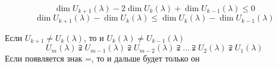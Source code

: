 \documentclass[algebra]{subfiles}
\begin{document}
    \begin{Consequence}
        \[\dim U_{k+1}(\lambda) - 2 \dim U_k(\lambda) + \dim U_{k-1}(\lambda) \leq 0\]
        \[\dim U_{k+1}(\lambda) - \dim U_k(\lambda) \leq \dim U_k(\lambda) - \dim U_{k-1}(\lambda)\]
    \end{Consequence}

    \begin{consequence}
        Если $U_{k+1} \neq U_k(\lambda)$, то и $U_k(\lambda) \neq U_{k-1}(\lambda)$
        \[U_m(\lambda) \supsetneqq U_{m-1} (\lambda) \supsetneqq U_{m-2} (\lambda) \supsetneqq ... \supsetneqq U_2(\lambda) \supsetneqq U_1(\lambda)\]
        Если появляется знак =, то и дальше будет только он
    \end{consequence}
\end{document}
